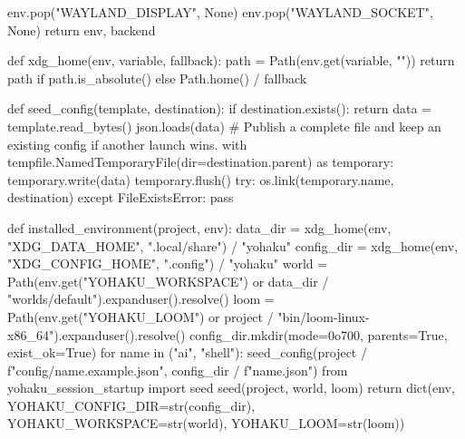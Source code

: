        env.pop("WAYLAND_DISPLAY", None)
        env.pop("WAYLAND_SOCKET", None)
    return env, backend


def xdg_home(env, variable, fallback):
    path = Path(env.get(variable, ""))
    return path if path.is_absolute() else Path.home() / fallback


def seed_config(template, destination):
    if destination.exists():
        return
    data = template.read_bytes()
    json.loads(data)
    # Publish a complete file and keep an existing config if another launch wins.
    with tempfile.NamedTemporaryFile(dir=destination.parent) as temporary:
        temporary.write(data)
        temporary.flush()
        try:
            os.link(temporary.name, destination)
        except FileExistsError:
            pass


def installed_environment(project, env):
    data_dir = xdg_home(env, "XDG_DATA_HOME", ".local/share") / "yohaku"
    config_dir = xdg_home(env, "XDG_CONFIG_HOME", ".config") / "yohaku"
    world = Path(env.get("YOHAKU_WORKSPACE") or data_dir / "worlds/default").expanduser().resolve()
    loom = Path(env.get("YOHAKU_LOOM") or project / "bin/loom-linux-x86_64").expanduser().resolve()
    config_dir.mkdir(mode=0o700, parents=True, exist_ok=True)
    for name in ("ai", "shell"):
        seed_config(project / f"config/{name}.example.json", config_dir / f"{name}.json")
    from yohaku_session_startup import seed
    seed(project, world, loom)
    return dict(env, YOHAKU_CONFIG_DIR=str(config_dir), YOHAKU_WORKSPACE=str(world),
                YOHAKU_LOOM=str(loom))


